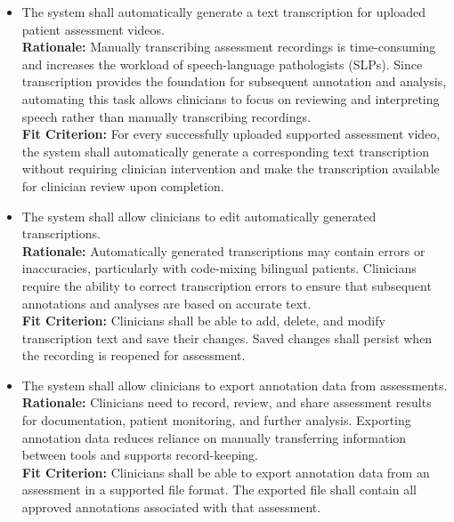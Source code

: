 \documentclass[12pt]{article}
\newcounter{reqnum} %
\newcommand{\rthereqnum}{FR\thereqnum}
\begin{document}
\noindent \begin{itemize}

\item[\textbf{\rthereqnum} \label{FR_AutomaticTranscription}:] The system shall automatically generate a text transcription for uploaded patient assessment videos.
\\ \textbf{Rationale:} Manually transcribing assessment recordings is time-consuming and increases the workload of speech-language pathologists (SLPs). Since transcription provides the foundation for subsequent annotation and analysis, automating this task allows clinicians to focus on reviewing and interpreting speech rather than manually transcribing recordings.
\\ \textbf{Fit Criterion:} For every successfully uploaded supported assessment video, the system shall automatically generate a corresponding text transcription without requiring clinician intervention and make the transcription available for clinician review upon completion.

\item[\textbf{\rthereqnum} \label{FR_TranscriptionEditing}:] The system shall allow clinicians to edit automatically generated transcriptions.
\\ \textbf{Rationale:} Automatically generated transcriptions may contain errors or inaccuracies, particularly with code-mixing bilingual patients. Clinicians require the ability to correct transcription errors to ensure that subsequent annotations and analyses are based on accurate text.
\\ \textbf{Fit Criterion:} Clinicians shall be able to add, delete, and modify transcription text and save their changes. Saved changes shall persist when the recording is reopened for assessment.

\item[\textbf{\rthereqnum} \label{FR_AnnotationExport}:] The system shall allow clinicians to export annotation data from assessments.
\\ \textbf{Rationale:} Clinicians need to record, review, and share assessment results for documentation, patient monitoring, and further analysis. Exporting annotation data reduces reliance on manually transferring information between tools and supports record-keeping.
\\ \textbf{Fit Criterion:} Clinicians shall be able to export annotation data from an assessment in a supported file format. The exported file shall contain all approved annotations associated with that assessment.


\end{itemize}
\end{document}
